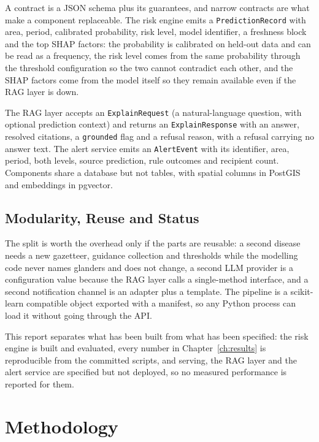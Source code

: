 \documentclass[10pt,openany]{report}
\begin{document}
A contract is a JSON schema plus its guarantees, and narrow contracts are what make a component
replaceable. The risk engine emits a \texttt{PredictionRecord} with area, period, calibrated
probability, risk level, model identifier, a freshness block and the top SHAP factors: the
probability is calibrated on held-out data and can be read as a frequency, the risk level comes from
the same probability through the threshold configuration so the two cannot contradict each other, and
the SHAP factors come from the model itself so they remain available even if the RAG layer is down.

The RAG layer accepts an \texttt{ExplainRequest} (a natural-language question, with optional
prediction context) and returns an \texttt{ExplainResponse} with an answer, resolved citations, a
\texttt{grounded} flag and a refusal reason, with a refusal carrying no answer text. The alert
service emits an \texttt{AlertEvent} with its identifier, area, period, both levels, source
prediction, rule outcomes and recipient count. Components share a database but not tables, with
spatial columns in PostGIS and embeddings in pgvector.

\section{Modularity, Reuse and Status}

The split is worth the overhead only if the parts are reusable: a second disease needs a new
gazetteer, guidance collection and thresholds while the modelling code never names glanders and does
not change, a second LLM provider is a configuration value because the RAG layer calls a
single-method interface, and a second notification channel is an adapter plus a template. The
pipeline is a scikit-learn compatible object \cite{pedregosa2011} exported with a manifest, so any
Python process can load it without going through the API.

This report separates what has been built from what has been specified: the risk engine is built and
evaluated, every number in Chapter~\ref{ch:results} is reproducible from the committed scripts, and
serving, the RAG layer and the alert service are specified but not deployed, so no measured
performance is reported for them.

\chapter{Methodology}
\label{ch:method}
\end{document}
